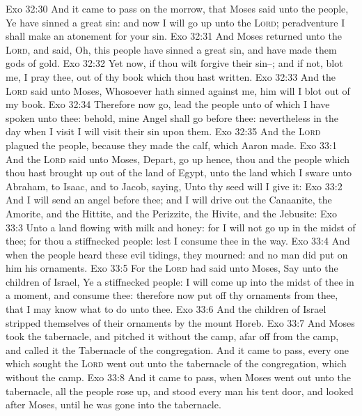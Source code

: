 \vs Exo 32:30 And it came to pass on the morrow, that Moses said unto the people, Ye have sinned a great sin: and now I will go up unto the \textsc{Lord}; peradventure I shall make an atonement for your sin.
\vs Exo 32:31 And Moses returned unto the \textsc{Lord}, and said, Oh, this people have sinned a great sin, and have made them gods of gold.
\vs Exo 32:32 Yet now, if thou wilt forgive their sin--; and if not, blot me, I pray thee, out of thy book which thou hast written.
\vs Exo 32:33 And the \textsc{Lord} said unto Moses, Whosoever hath sinned against me, him will I blot out of my book.
\vs Exo 32:34 Therefore now go, lead the people unto  of which I have spoken unto thee: behold, mine Angel shall go before thee: nevertheless in the day when I visit I will visit their sin upon them.
\vs Exo 32:35 And the \textsc{Lord} plagued the people, because they made the calf, which Aaron made.
\vs Exo 33:1 And the \textsc{Lord} said unto Moses, Depart,  go up hence, thou and the people which thou hast brought up out of the land of Egypt, unto the land which I sware unto Abraham, to Isaac, and to Jacob, saying, Unto thy seed will I give it:
\vs Exo 33:2 And I will send an angel before thee; and I will drive out the Canaanite, the Amorite, and the Hittite, and the Perizzite, the Hivite, and the Jebusite:
\vs Exo 33:3 Unto a land flowing with milk and honey: for I will not go up in the midst of thee; for thou  a stiffnecked people: lest I consume thee in the way.
\vs Exo 33:4 And when the people heard these evil tidings, they mourned: and no man did put on him his ornaments.
\vs Exo 33:5 For the \textsc{Lord} had said unto Moses, Say unto the children of Israel, Ye  a stiffnecked people: I will come up into the midst of thee in a moment, and consume thee: therefore now put off thy ornaments from thee, that I may know what to do unto thee.
\vs Exo 33:6 And the children of Israel stripped themselves of their ornaments by the mount Horeb.
\vs Exo 33:7 And Moses took the tabernacle, and pitched it without the camp, afar off from the camp, and called it the Tabernacle of the congregation. And it came to pass,  every one which sought the \textsc{Lord} went out unto the tabernacle of the congregation, which  without the camp.
\vs Exo 33:8 And it came to pass, when Moses went out unto the tabernacle,  all the people rose up, and stood every man  his tent door, and looked after Moses, until he was gone into the tabernacle.
